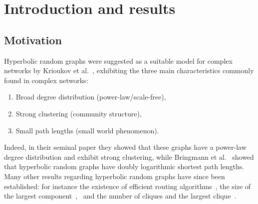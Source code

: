 \section{Introduction and results}

\subsection{Motivation}


Hyperbolic random graphs were suggested as a suitable model for complex networks by Krioukov et al.~\cite{krioukov2010hyperbolic}, exhibiting the three main characteristics commonly found in complex networks: 
\begin{enumerate}[\upshape 1)]
\item Broad degree distribution (power-law/scale-free),
\item Strong clustering (community structure),
\item Small path lengths (small world phenomenon).
\end{enumerate}
Indeed, in their seminal paper they showed that these graphs have a power-law degree distribution and exhibit strong clustering, while Bringmann et al.~\cite{bringmann2016average} showed that hyperbolic random graphs have doubly logarithmic shortest path lengths. 
Many other results regarding hyperbolic random graphs have since been established: for instance the existence of efficient routing algorithms~\cite{bringmann2017greedy}, the size of the largest component~\cite{bode2015largest},~\cite{fountoulakis2018law} and the number of cliques and the largest clique~\cite{blasius2018cliques}. 

